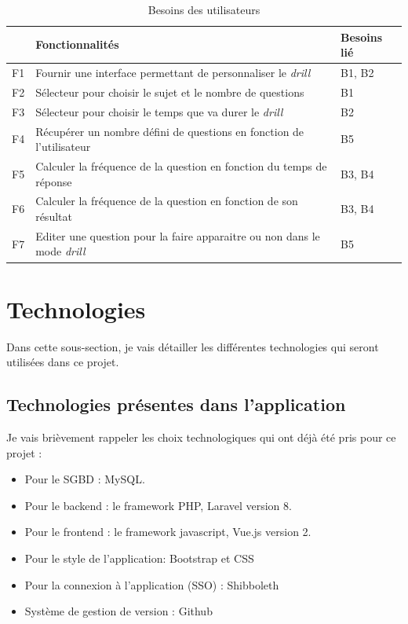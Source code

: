 \begin{table}[h]
  \begin{center}
    \caption{Besoins des utilisateurs \label{Besoins}}
    \begin{tabular}{|l|l|l|}
      \hline
      \textbf{} & \textbf{Fonctionnalités}                                                      & \textbf{Besoins lié} \\
      \hline
      F1        & Fournir une interface permettant de personnaliser le \emph{drill}             & B1, B2               \\
      \hline
      F2        & Sélecteur pour choisir le sujet et le nombre de questions                     & B1                   \\
      \hline
      F3        & Sélecteur pour choisir le temps que va durer le \emph{drill}                  & B2                   \\
      \hline
      F4        & Récupérer un nombre défini de questions en fonction de l'utilisateur          & B5                   \\
      \hline
      F5        & Calculer la fréquence de la question en fonction du temps de réponse          & B3, B4               \\
      \hline
      F6        & Calculer la fréquence de la question en fonction de son résultat              & B3, B4               \\
      \hline
      F7        & Editer une question pour la faire apparaitre ou non dans le mode \emph{drill} & B5                   \\
      \hline
    \end{tabular}
  \end{center}
\end{table}



\section{Technologies}
Dans cette sous-section, je vais détailler les différentes technologies qui seront utilisées dans ce projet.
\subsection{Technologies présentes dans l'application}
Je vais brièvement rappeler les choix technologiques qui ont déjà été pris pour ce projet :
\begin{itemize}
  \item Pour le SGBD : MySQL.
  \item Pour le backend : le framework PHP, Laravel version 8.
  \item Pour le frontend : le framework javascript, Vue.js version 2.
  \item Pour le style de l'application: Bootstrap et CSS
  \item Pour la connexion à l'application (SSO) : Shibboleth
  \item Système de gestion de version : Github
\end{itemize}

